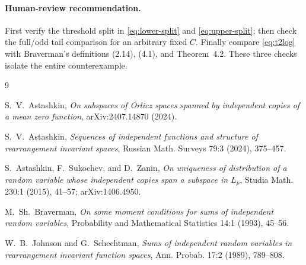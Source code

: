 \documentclass[11pt]{article}
\theoremstyle{definition}
\theoremstyle{remark}
\begin{document}
\paragraph{Human-review recommendation.}
First verify the threshold split in \eqref{eq:lower-split} and
\eqref{eq:upper-split}; then check the full/odd tail comparison for an
arbitrary fixed $C$.  Finally compare \eqref{eq:t2log} with Braverman's
definitions (2.14), (4.1), and Theorem~4.2.  These three checks isolate the
entire counterexample.

\begin{thebibliography}{9}

S.~V.~Astashkin,
\emph{On subspaces of Orlicz spaces spanned by independent copies of a mean
zero function}, arXiv:2407.14870 (2024).

S.~V.~Astashkin,
\emph{Sequences of independent functions and structure of rearrangement
invariant spaces}, Russian Math. Surveys 79:3 (2024), 375--457.

S.~Astashkin, F.~Sukochev, and D.~Zanin,
\emph{On uniqueness of distribution of a random variable whose independent
copies span a subspace in $L_p$}, Studia Math. 230:1 (2015), 41--57;
arXiv:1406.4950.

M.~Sh.~Braverman,
\emph{On some moment conditions for sums of independent random variables},
Probability and Mathematical Statistics 14:1 (1993), 45--56.

W.~B.~Johnson and G.~Schechtman,
\emph{Sums of independent random variables in rearrangement invariant
function spaces}, Ann. Probab. 17:2 (1989), 789--808.

\end{thebibliography}
\end{document}
